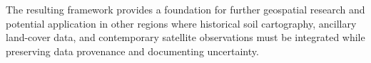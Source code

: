 The resulting framework provides a foundation
for further geospatial research and potential
application in other regions where historical
soil cartography, ancillary land-cover data,
and contemporary satellite observations must
be integrated while preserving data provenance
and documenting uncertainty.